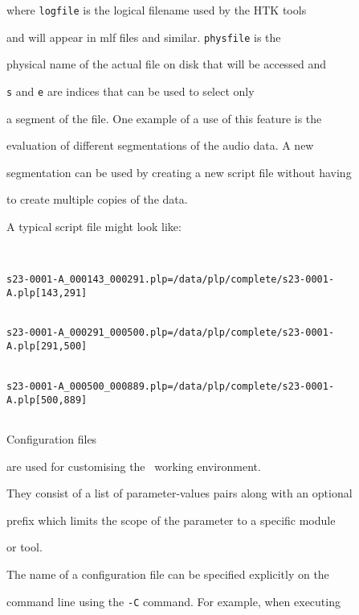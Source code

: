 where \texttt{logfile} is the logical filename used by the HTK tools


and will appear in mlf files and similar. \texttt{physfile} is the


physical name of the actual file on disk that will be accessed and


\texttt{s} and \texttt{e} are indices that can be used to select only


a segment of the file. One example of a use of this feature is the


evaluation of different segmentations of the audio data. A new


segmentation can be used by creating a new script file without having


to create multiple copies of the data.





A typical script file might look like:


\begin{verbatim}


s23-0001-A_000143_000291.plp=/data/plp/complete/s23-0001-A.plp[143,291]


s23-0001-A_000291_000500.plp=/data/plp/complete/s23-0001-A.plp[291,500]


s23-0001-A_000500_000889.plp=/data/plp/complete/s23-0001-A.plp[500,889]


\end{verbatim}













Configuration files 


are used for customising the \HTK\ working environment.


They consist of a list of parameter-values pairs along with an optional


prefix which limits the scope of the parameter to a specific module


or tool.





The name of a configuration file can be specified explicitly on the


command line using the \texttt{-C} command.  For example, when executing


